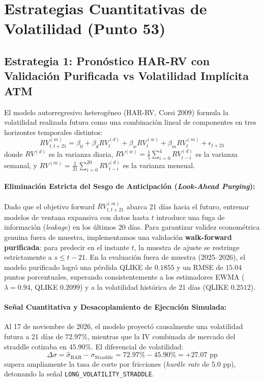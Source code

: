 \documentclass[11pt,a4paper]{article}
\begin{document}
\newpage
\section{Estrategias Cuantitativas de Volatilidad (Punto 53)}

\subsection{Estrategia 1: Pronóstico HAR-RV con Validación Purificada vs Volatilidad Implícita ATM}
El modelo autorregresivo heterogéneo (HAR-RV, Corsi 2009) formula la volatilidad realizada futura como una combinación lineal de componentes en tres horizontes temporales distintos:
\begin{equation}
    RV_{t, t+21}^{(m)} = \beta_0 + \beta_d RV_t^{(d)} + \beta_w RV_t^{(w)} + \beta_m RV_t^{(m)} + \epsilon_{t+21}
\end{equation}
donde $RV^{(d)}$ es la varianza diaria, $RV^{(w)} = \frac{1}{5}\sum_{i=0}^4 RV_{t-i}^{(d)}$ es la varianza semanal, y $RV^{(m)} = \frac{1}{21}\sum_{i=0}^{20} RV_{t-i}^{(d)}$ es la varianza mensual.

\paragraph{Eliminación Estricta del Sesgo de Anticipación (\textit{Look-Ahead Purging}):}
Dado que el objetivo forward $RV_{t, t+21}^{(m)}$ abarca 21 días hacia el futuro, entrenar modelos de ventana expansiva con datos hasta $t$ introduce una fuga de información (\textit{leakage}) en los últimos 20 días. Para garantizar validez econométrica genuina fuera de muestra, implementamos una validación \textbf{walk-forward purificada}: para predecir en el instante $t$, la muestra de ajuste se restringe estrictamente a $s \le t - 21$.
En la evaluación fuera de muestra (2025--2026), el modelo purificado logró una pérdida QLIKE de $0.1855$ y un RMSE de $15.04$ puntos porcentuales, superando consistentemente a los estimadores EWMA ($\lambda=0.94$, QLIKE $0.2099$) y a la volatilidad histórica de 21 días (QLIKE $0.2512$).

\paragraph{Señal Cuantitativa y Desacoplamiento de Ejecución Simulada:}
Al 17 de noviembre de 2026, el modelo proyectó causalmente una volatilidad futura a 21 días de $72.97\%$, mientras que la IV combinada de mercado del straddle cotizaba en $45.90\%$.
El diferencial de volatilidad:
\begin{equation}
    \Delta \sigma = \widehat{\sigma}_{\text{HAR}} - \sigma_{\text{Straddle}} = 72.97\% - 45.90\% = +27.07 \text{ pp}
\end{equation}
supera ampliamente la tasa de corte por fricciones (\textit{hurdle rate} de $5.0$ pp), detonando la señal \texttt{LONG\_VOLATILITY\_STRADDLE}.
\end{document}
